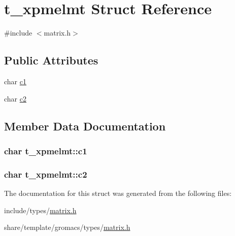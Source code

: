 \hypertarget{structt__xpmelmt}{\section{t\-\_\-xpmelmt \-Struct \-Reference}
\label{structt__xpmelmt}
}


{\ttfamily \#include $<$matrix.\-h$>$}

\subsection*{\-Public \-Attributes}
\begin{DoxyCompactItemize}
\item 
char \hyperlink{structt__xpmelmt_a65fc8cdd59487b5050b459b7ca61cb1b}{c1}
\item 
char \hyperlink{structt__xpmelmt_a3640e728f9bd568586fea3a8b57933ce}{c2}
\end{DoxyCompactItemize}


\subsection{\-Member \-Data \-Documentation}
\hypertarget{structt__xpmelmt_a65fc8cdd59487b5050b459b7ca61cb1b}{
\subsubsection[{c1}]{\setlength{\rightskip}{0pt plus 5cm}char {\bf t\-\_\-xpmelmt\-::c1}}}\label{structt__xpmelmt_a65fc8cdd59487b5050b459b7ca61cb1b}
\hypertarget{structt__xpmelmt_a3640e728f9bd568586fea3a8b57933ce}{
\subsubsection[{c2}]{\setlength{\rightskip}{0pt plus 5cm}char {\bf t\-\_\-xpmelmt\-::c2}}}\label{structt__xpmelmt_a3640e728f9bd568586fea3a8b57933ce}


\-The documentation for this struct was generated from the following files\-:\begin{DoxyCompactItemize}
\item 
include/types/\hyperlink{include_2types_2matrix_8h}{matrix.\-h}\item 
share/template/gromacs/types/\hyperlink{share_2template_2gromacs_2types_2matrix_8h}{matrix.\-h}\end{DoxyCompactItemize}
